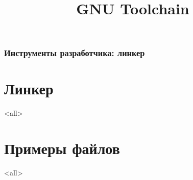 
\title[toolchain]{GNU Toolchain}




\begin{frame}
	\frametitle{Инструменты разработчика: линкер}
	\titlepage
	\vspace{-0.5cm}
	\begin{center}
	\end{center}
\end{frame}

\begin{frame}
	\tableofcontents
\end{frame}



\section{Линкер}

\mode<all>{}

\section[example]{Примеры файлов}

\mode<all>{}


